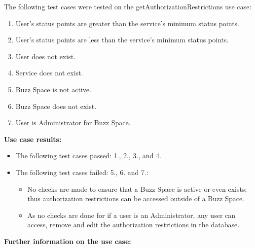The following test cases were tested on the getAuthorizationRestrictions use case:
\begin{enumerate}
	\item User's status points are greater than the service's minimum status points.
	\item User's status points are less than the service's minimum status points.
	\item User does not exist.
  	\item Service does not exist.
  	\item Buzz Space is not active.
  	\item Buzz Space does not exist.
  	\item User is Administrator for Buzz Space.
\end{enumerate}
\medskip

\textbf{Use case results:}\newline

\begin{itemize}
\item The following test cases passed: 1., 2., 3., and 4.
\item The following test cases failed: 5., 6. and 7.:
	\begin{itemize}
		\item No checks are made to ensure that a Buzz Space is active or even exists; thus authorization restrictions can be accessed outside of a Buzz Space.
		\item As no checks are done for if a user is an Administrator, any user can access, remove and edit the authorization restrictions in the database.
	\end{itemize}
	
\end{itemize}

\textbf{Further information on the use case:}
\noindent
\medskip

